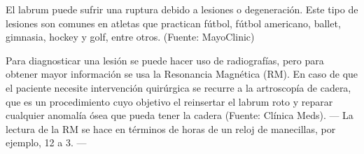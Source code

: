 \documentclass{book}
\begin{document}
\begin{itemize}
	        
	        El labrum puede sufrir una ruptura debido a lesiones o degeneración.  Este tipo de lesiones son comunes en atletas que practican fútbol, fútbol americano, ballet, gimnasia, hockey y golf, entre otros. (Fuente: MayoClinic)
	        
	      
	      
	        Para diagnosticar una lesión se puede hacer uso de radiografías, pero para obtener mayor información se usa la Resonancia Magnética (RM). En caso de que el paciente necesite intervención quirúrgica se recurre a la artroscopía de cadera, que es un procedimiento cuyo objetivo el reinsertar el labrum roto y reparar cualquier anomalía ósea que pueda tener la cadera (Fuente: Clínica Meds). --- La lectura de la RM se hace en términos de horas de un reloj de manecillas, por ejemplo, 12 a 3. ---
	        
			
		\end{itemize}
		
\end{document}
